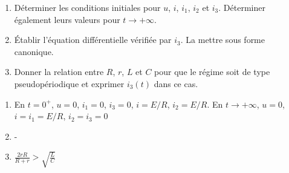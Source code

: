 \begin{enumerate}
	\item Déterminer les conditions initiales pour $u$, $i$, $i_1$, $i_2$ et $i_3$. Déterminer également leurs valeurs pour $t\rightarrow+\infty$.
	\item Établir l'équation différentielle vérifiée par $i_3$. La mettre sous forme canonique.
	\item Donner la relation entre $R$, $r$, $L$ et $C$ pour que le régime soit de type pseudopériodique et exprimer $i_3(t)$ dans ce cas.
\end{enumerate}

\begin{enumerate}
	\item En $t=0^+$, $u=0$, $i_1=0$, $i_3=0$, $i=E/R$, $i_2=E/R$. En $t\rightarrow+\infty$, $u=0$, $i=i_1=E/R$, $i_2=i_3=0$
	\item -
	\item $\frac{2rR}{R+r} > \sqrt{\frac{L}{C}}$
\end{enumerate}

